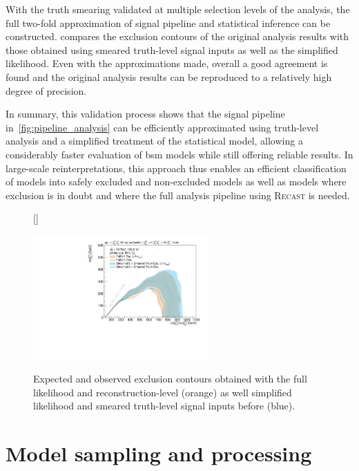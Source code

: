 With the truth smearing validated at multiple selection levels of the analysis, the full two-fold approximation of signal pipeline and statistical inference can be constructed.  compares the exclusion contours of the original analysis results with those obtained using smeared truth-level signal inputs as well as the simplified likelihood. Even with the approximations made, overall a good agreement is found and the original analysis results can be reproduced to a relatively high degree of precision.

In summary, this validation process shows that the signal pipeline in~\cref{fig:pipeline_analysis} can be efficiently approximated using truth-level analysis and a simplified treatment of the statistical model, allowing a considerably faster evaluation of \gls{bsm} models while still offering reliable results. In large-scale reinterpretations, this approach thus enables an efficient classification of models into safely excluded and non-excluded models as well as models where exclusion is in doubt and where the full analysis pipeline using \textsc{Recast} is needed.

\begin{figure}
[\FBwidth]
{\caption{Expected and observed exclusion contours obtained with the full likelihood and reconstruction-level (orange) as well simplified likelihood and smeared truth-level signal inputs before (blue).}\label{fig:simplified_truth_result}}
{\includegraphics[width=0.60\textwidth]{exclusion_1Lbb_truthInput_BkgSignal_700_200_noLabel}}
\end{figure}

\section{Model sampling and processing}\label{sec:pmssm_sampling}


